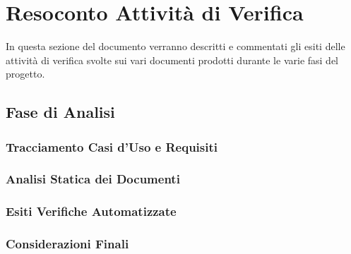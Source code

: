 \section{Resoconto Attività di Verifica}
In questa sezione del documento verranno descritti e commentati gli esiti delle attività di verifica svolte sui vari documenti prodotti durante le varie fasi del progetto.

\subsection{Fase di Analisi}


\subsubsection{Tracciamento Casi d’Uso e Requisiti}


\subsubsection{Analisi Statica dei Documenti}


\subsubsection{Esiti Verifiche Automatizzate}


\subsubsection{Considerazioni Finali}

